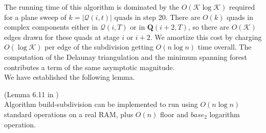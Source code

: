 The running time of this algorithm is dominated by the $O(\mathcal{K} \log \mathcal{K})$ required for 
a plane sweep \cite{CompGeo} of $k=|\mathcal{Q}(i,t)|$ quads in step 20. There are $O(k)$ quads in complex 
components either in $\mathcal{Q}(i,T)$ or in $\mathbf{Q}(i+2,T)$, so there are $O(\mathcal{K})$ edges
drawn for these quads at stage $i$ or $i+2$. We amortize this cost by charging $O(\log \mathcal{K})$ per edge of 
the subdivision getting $O(n\log n)$ time overall. The computation of the Delaunay triangulation and the
minimum spanning forest contributes a term of the same asymptotic magnitude.\\

We have established the following lemma.

\begin{Lemma} (Lemma 6.11 in \cite{HershbergerS99}) \label{lemma:6.11HershbergerS99}\\
Algorithm build-subdivision can be implemented to run using $O(n \log n)$ standard operations on a real RAM, plus $O(n)$ floor and $base_2$ logarithm operation.
\end{Lemma}